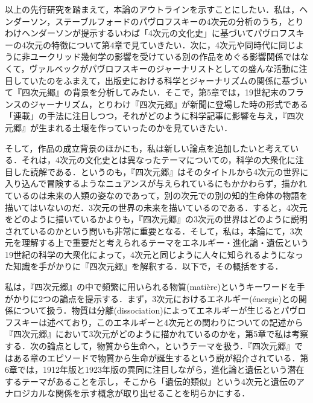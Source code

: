以上の先行研究を踏まえて，本論のアウトラインを示すことにしたい．私は，ヘンダーソン，ステーブルフォードのパヴロフスキーの4次元の分析のうち，とりわけヘンダーソンが提示するいわば「4次元の文化史」に基づいてパヴロフスキーの4次元の特徴について第4章で見ていきたい．次に，4次元や同時代に同じように非ユークリッド幾何学の影響を受けている別の作品をめぐる影響関係ではなくて，ヴァルベックがパヴロフスキーのジャーナリストとしての盛んな活動に注目していたのをふまえて，出版史における科学とジャーナリズムの関係に基づいて『四次元郷』の背景を分析してみたい．そこで，第5章では，19世紀末のフランスのジャーナリズム，とりわけ『四次元郷』が新聞に登場した時の形式である「連載」の手法に注目しつつ，それがどのように科学記事に影響を与え，『四次元郷』が生まれる土壌を作っていったのかを見ていきたい．

そして，作品の成立背景のほかにも，私は新しい論点を追加したいと考えている．それは，4次元の文化史とは異なったテーマについての，科学の大衆化に注目した読解である．というのも，『四次元郷』はそのタイトルから4次元の世界に入り込んで冒険するようなニュアンスが与えられているにもかかわらず，描かれているのは未来の人類の姿なのであって，別の次元での別の知的生命体の物語を描いてはいないのだ．3次元の世界の未来を描いているのである．すると，4次元をどのように描いているかよりも，『四次元郷』の3次元の世界はどのように説明されているのかという問いも非常に重要となる．そして，私は，本論にて，3次元を理解する上で重要だと考えられるテーマをエネルギー・進化論・遺伝という19世紀の科学の大衆化によって，4次元と同じように人々に知られるようになった知識を手がかりに『四次元郷』を解釈する．以下で，その概括をする．

私は，『四次元郷』の中で頻繁に用いられる物質(matière)というキーワードを手がかりに2つの論点を提示する．まず，3次元におけるエネルギー(énergie)との関係について扱う．物質は分離(dissociation)によってエネルギーが生じるとパヴロフスキーは述べており，このエネルギーと4次元との関わりについての記述から『四次元郷』において3次元がどのように描かれているのかを，第5章で私は考察する．次の論点として，物質から生命へ，というテーマを扱う．『四次元郷』ではある章のエピソードで物質から生命が誕生するという説が紹介されている．第6章では，1912年版と1923年版の異同に注目しながら，進化論と遺伝という潜在するテーマがあることを示し，そこから「遺伝的類似」という4次元と遺伝のアナロジカルな関係を示す概念が取り出せることを明らかにする．

